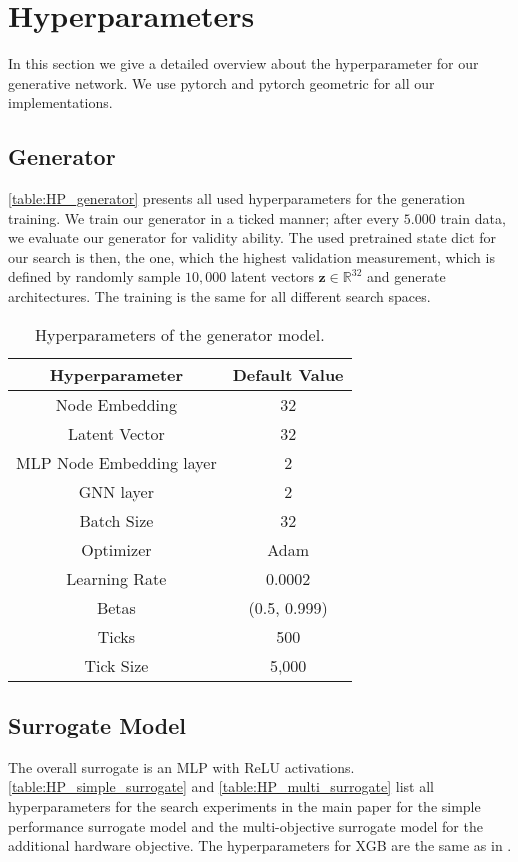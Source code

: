 \documentclass[runningheads]{llncs}
\begin{document}
\section{Hyperparameters}\label{sec:HP}
In this section we give a detailed overview about the hyperparameter for our generative network.
We use pytorch \cite{pytorch} and pytorch geometric \cite{PYG} for all our implementations. 
\subsection{Generator}
\autoref{table:HP_generator} presents all used hyperparameters for the generation training. 
We train our generator in a ticked manner; after every $5.000$ train data, we evaluate our generator for validity ability. The used pretrained state dict for our search is then, the one, which the highest validation measurement, which is defined by randomly sample $10,000$ latent vectors $\textbf{z} \in \mathbb{R}^{32}$ and generate architectures. 
The training is the same for all different search spaces.
\begin{table}[h]
	\scriptsize
	\centering
	\caption{Hyperparameters of the generator model.}\label{table:HP_generator}
	\begin{tabular}{ c || c}
		\toprule
		
		Hyperparameter      & Default Value  \\
		\midrule
		Node Embedding      & 32        \\
		Latent Vector       & 32       \\
		MLP Node Embedding layer & 2         \\
		GNN layer           & 2       \\
		Batch Size          & 32       \\
		Optimizer            & Adam \cite{2015ADAM}     \\
		Learning Rate       &  0.0002    \\
		Betas       & (0.5, 0.999)        \\
		Ticks     & 500 \\
		Tick Size & 5,000  \\
		\bottomrule
	\end{tabular}
\end{table}

\subsection{Surrogate Model}
The overall surrogate is an MLP with ReLU activations.
\autoref{table:HP_simple_surrogate} and \autoref{table:HP_multi_surrogate} list all hyperparameters for the search experiments in the main paper for the simple performance surrogate model and the multi-objective surrogate model for the additional hardware objective.
The hyperparameters for XGB \cite{XGB} are the same as in \cite{NBSuite}. 
\end{document}
